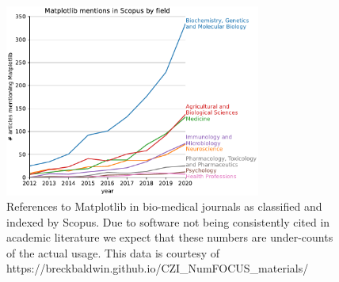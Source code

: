 \documentclass[letter]{article}
\begin{document}
\begin{figure}
  \begin{center}
    \includegraphics[width=0.75\textwidth]{scopus_mentions.pdf}
  \end{center}
  \caption{References to Matplotlib in bio-medical journals as
    classified and indexed by Scopus.  Due to software not being consistently
    cited in academic literature we expect that these numbers are under-counts
    of the actual usage.  This data is courtesy of
    https://breckbaldwin.github.io/CZI\_NumFOCUS\_materials/ }
\end{figure}
\end{document}
